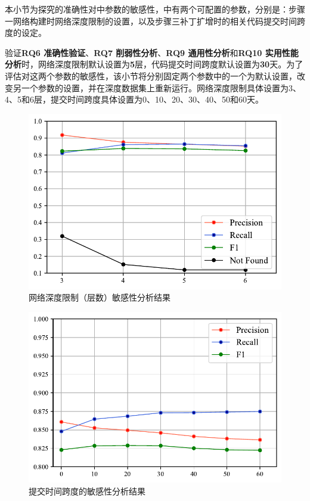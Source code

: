 本小节为探究\tool 的准确性对\tool 中参数的敏感性，\tool 中有两个可配置的参数，分别是：\tool 步骤一网络构建时网络深度限制的设置，以及步骤三补丁扩增时的相关代码提交时间跨度的设定。

验证\textbf{RQ6 准确性验证}、\textbf{RQ7 削弱性分析}、\textbf{RQ9 通用性分析}和\textbf{RQ10 实用性能分析}时，网络深度限制默认设置为\textbf{5}层，代码提交时间跨度默认设置为\textbf{30}天。为了评估\tool 对这两个参数的敏感性，该小节将分别固定两个参数中的一个为默认设置，改变另一个参数的设置，并在深度数据集上重新运行\tool 。网络深度限制具体设置为3、4、5和6层，提交时间跨度具体设置为0、10、20、30、40、50和60天。
\begin{figure}[h]
    \centering
    \includegraphics[scale=1.0]{fig/rq8-sensitivity-depth.pdf}
    \caption{网络深度限制（层数）敏感性分析结果}\label{fig:depth}
\end{figure}

\begin{figure}[h]
    \centering
    \includegraphics[scale=1.0]{fig/rq8-sensitivity-span.pdf}
    \caption{提交时间跨度的敏感性分析结果}\label{fig:span}
\end{figure}


